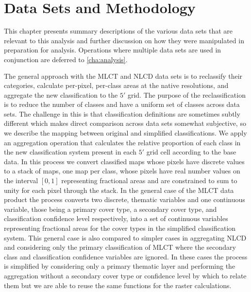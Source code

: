 









\graphicspath{ {datasets/} }


\chapter{Data Sets and Methodology}
\label{cha:datasets}

This chapter presents summary descriptions of the various data sets
that are relevant to this analysis and further discussion on how they
were manipulated in preparation for analysis.  Operations where
multiple data sets are used in conjunction are deferred to
\autoref{cha:analysis}.

The general approach with the MLCT and NLCD data sets is to reclassify
their categories, calculate per-pixel, per-class areas at the native
resolutions, and aggregate the new classification to the $5'$ grid.
The purpose of the reclassification is to reduce the number of classes
and have a uniform set of classes across data sets.  The challenge in
this is that classification definitions are sometimes subtly different
which makes direct comparison across data sets somewhat subjective, so
we describe the mapping between original and simplified
classifications.  We apply an aggregation operation that calculates
the relative proportion of each class in the new classification system
present in each $5'$ grid cell according to the base data.  In this
process we convert classified maps whose pixels have discrete values
to a stack of maps, one map per class, whose pixels have real number
values on the interval $[0,1]$ representing fractional areas and are
constrained to sum to unity for each pixel through the stack.  In the
general case of the MLCT data product the process converts two
discrete, thematic variables and one continuous variable, those being
a primary cover type, a secondary cover type, and classification
confidence level respectively, into a set of continuous variables
representing fractional areas for the cover types in the simplified
classification system.  This general case is also compared to simpler
cases in aggregating NLCD and considering only the primary
classification of MLCT where the secondary class and classification
confidence variables are ignored.  In these cases the process is
simplified by considering only a primary thematic layer and performing
the aggregation without a secondary cover type or confidence level by
which to relate them but we are able to reuse the same functions for
the raster calculations.

